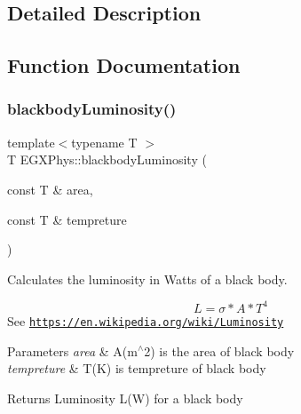 \subsection{Detailed Description}


\subsection{Function Documentation}
\mbox{\label{group___astrophysics_ga909f82edfaed449b44e94788b642ebb8}} 
\subsubsection{\texorpdfstring{blackbody\+Luminosity()}{blackbodyLuminosity()}}
{\footnotesize\ttfamily template$<$typename T $>$ \\
T E\+G\+X\+Phys\+::blackbody\+Luminosity (\begin{DoxyParamCaption}\item[{const T \&}]{area,  }\item[{const T \&}]{tempreture }\end{DoxyParamCaption})}



Calculates the luminosity in Watts of a black body. 

\[L=\sigma*A*T^4\] See \href{https://en.wikipedia.org/wiki/Luminosity}{\tt https\+://en.\+wikipedia.\+org/wiki/\+Luminosity}


\begin{DoxyParams}{Parameters}
{\em area} & A(m$^\wedge$2) is the area of black body \\
\hline
{\em tempreture} & T(\+K) is tempreture of black body \\
\hline
\end{DoxyParams}
\begin{DoxyReturn}{Returns}
Luminosity L(\+W) for a black body 
\end{DoxyReturn}
\mbox{\label{group___astrophysics_gacf3a720793cdb27f6d93b170b44e81be}} 
